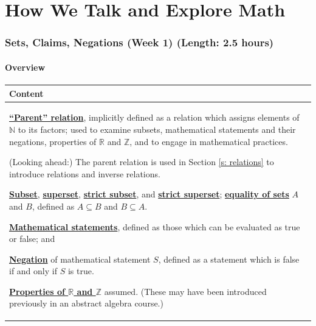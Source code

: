 \documentclass[11pt]{article}
\newcommand{\R}{\mathbb{R}}
\newcommand{\N}{\mathbb{N}}
\newcommand{\Z}{\mathbb{Z}}
\renewcommand\subset\subseteq
\renewcommand\emph[1]{\underline{\bf{#1}}} %
\theoremstyle{definition}
\begin{document}
\newpage 
\part{How We Talk and Explore Math} 
\section{Sets, Claims, Negations (Week 1) (Length: 2.5 hours)}  %

\subsection{Overview}
 
 \vspace*{-16pt}
\begin{tabular}{L{6.5in}} 
{\bf Content} \\ \hline \parskip4pt
\emph{``Parent'' relation}, implicitly defined as a relation which assigns elements of $\N$ to its factors; used to examine subsets, mathematical statements and their negations, properties of $\R$ and $\Z$, and to engage in mathematical practices. 

(Looking ahead:) The parent relation is used in Section \ref{s: relations} to introduce relations and inverse relations.

\emph{Subset}, \emph{superset}, \emph{strict subset}, and \emph{strict superset}; \emph{equality of sets} $A$ and $B$, defined as $A\subset B$ and $B\subset A$.

\emph{Mathematical statements}, defined as those which can be evaluated as true or false; and 

\emph{Negation} of mathematical statement $S$, defined as a statement which is false if and only if $S$ is true.

\emph{Properties of $\R$ and $\Z$} assumed. (These may have been introduced previously in an abstract algebra course.)
\end{tabular}
\end{document}
